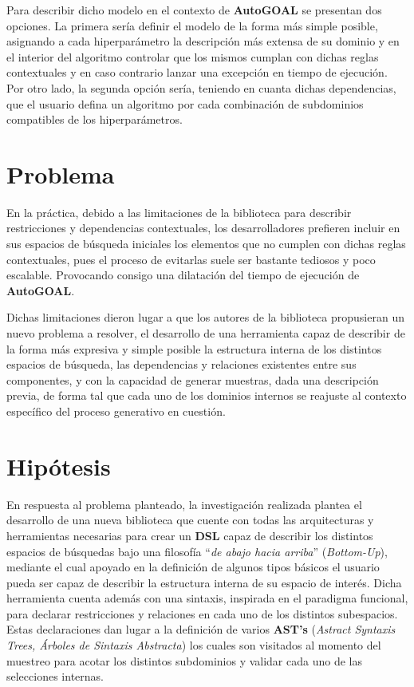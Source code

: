 Para describir dicho modelo en el contexto de {\bf AutoGOAL} se presentan dos opciones.
La primera sería definir el modelo de la forma más simple posible, asignando a cada
hiperparámetro la descripción más extensa de su dominio y en el interior del algoritmo
controlar que los mismos cumplan con dichas reglas contextuales y en caso contrario
lanzar una excepción en tiempo de ejecución. Por otro lado, la segunda opción sería, teniendo
en cuanta dichas dependencias, que el usuario defina un algoritmo por cada combinación de
subdominios compatibles de los hiperparámetros.

\section*{Problema}

En la práctica, debido a las limitaciones de la biblioteca para describir
restricciones y dependencias contextuales, los desarrolladores prefieren incluir
en sus espacios de búsqueda iniciales los elementos que no cumplen  
con dichas reglas contextuales, pues el proceso de evitarlas suele
ser bastante tediosos y poco escalable. Provocando consigo una dilatación del
tiempo de ejecución de {\bf AutoGOAL}.

Dichas limitaciones dieron lugar a que los autores de la biblioteca propusieran
un nuevo problema a resolver, el desarrollo de una herramienta capaz de describir de
la forma más expresiva y simple posible la estructura interna de los
distintos espacios de búsqueda, las dependencias y relaciones existentes entre sus
componentes, y con la capacidad de generar muestras, dada una descripción
previa, de forma tal que cada uno de los dominios internos se reajuste al contexto
específico del proceso generativo en cuestión.

\section*{Hipótesis}

En respuesta al problema planteado, la investigación realizada plantea el desarrollo de una
nueva biblioteca que cuente con todas las arquitecturas y herramientas necesarias para
crear un {\bf DSL} capaz de describir los distintos espacios de búsquedas bajo una
filosofía ``{\it de abajo hacia arriba}'' ({\it Bottom-Up}), mediante el cual apoyado
en la definición de algunos tipos básicos el usuario pueda ser capaz de describir la
estructura interna de su espacio de interés. Dicha herramienta cuenta además con una
sintaxis, inspirada en el paradigma funcional, para declarar restricciones y
relaciones en cada uno de los distintos subespacios. Estas declaraciones dan lugar a la
definición de varios {\bf AST's} ({\it Astract Syntaxis Trees, Árboles de Sintaxis
        Abstracta}) los cuales son visitados al momento del muestreo para acotar los distintos
subdominios y validar cada uno de las selecciones internas.

